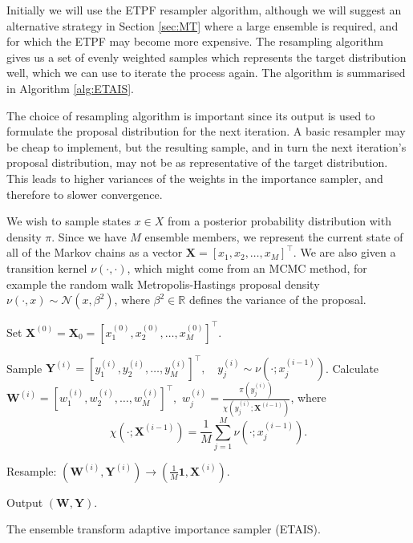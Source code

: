 \documentclass[final]{siamltex}
\newcommand{\X}{{\mathbf X}}
\newcommand{\Y}{{\mathbf Y}}
\newcommand{\W}{{\mathbf W}}
\begin{document}
Initially we
will use the ETPF resampler algorithm\cite{reich2013nonparametric}, although we
will suggest an alternative strategy in Section \ref{sec:MT} where a
large ensemble is required, and for which the ETPF may become more expensive. The
resampling algorithm gives us a set of evenly weighted samples which
represents the target distribution well, which we can use to iterate
the process again. The algorithm is summarised in Algorithm
\ref{alg:ETAIS}.

{\red The choice of resampling algorithm is important since its
  output is used to formulate the proposal distribution for the next
  iteration. A basic resampler may be cheap to implement, but the
  resulting sample, and in turn the next iteration's proposal distribution, may not be as representative of the target
  distribution. This leads to higher variances of the weights in the
  importance sampler, and therefore to slower convergence.}

We wish to sample states $x \in X$ from a posterior
probability distribution with density {\red $\pi$}. Since we have $M$ ensemble members, we
represent the current state of all of the Markov chains as a vector
$\X = [x_1,x_2,\ldots,x_M]^\top$. We are also given a transition kernel
$\nu(\cdot,\cdot)$, which might come from an MCMC method, for example
the random walk Metropolis-Hastings proposal density $\nu(\cdot,x) \sim
\mathcal{N}(x,\beta^2)$, where $\beta^2\in \mathbb{R}$ defines the
variance of the proposal.

\begin{table}[!ht]
\centering
\begin{algorithm}[H]
\DontPrintSemicolon
\BlankLine
	Set $\X^{(0)} = \X_0 = [x_1^{(0)},x_2^{(0)},\ldots,x_M^{(0)}]^\top$.\;
	{
		Sample $\Y^{(i)} = [y_1^{(i)},y_2^{(i)},\ldots,y_M^{(i)}]^\top, \quad y_j^{(i)} \sim
\nu(\cdot;x_j^{(i-1)})$.\label{algline:ETAIS_propose}\;
		Calculate $\W^{(i)} = [w_1^{(i)},w_2^{(i)},\ldots,w_M^{(i)}]^\top,$ \quad $w^{(i)}_j =
\frac{\pi(y_j^{(i)})}{\chi(y_j^{(i)};\X^{(i-1)})}$, where
		\[
			\chi(\cdot;\X^{(i-1)}) = \frac{1}{M}\sum_{j=1}^M \nu(\cdot;x_j^{(i-1)}).
		\]

		Resample: $(\W^{(i)},\Y^{(i)}) \rightarrow (\frac{1}{M}\mathbf{1}, \X^{(i)})$.\label{algline:ETAIS_resample}\;
	}
	Output $(\W, \Y)$.\;
\caption{The ensemble transform adaptive importance sampler (ETAIS).\label{alg:ETAIS}}
\end{algorithm}
\end{table}
\end{document}
